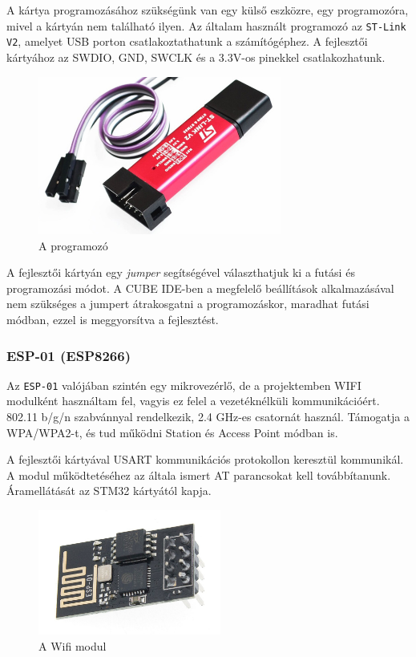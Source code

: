 \documentclass[a4paper, 12pt]{article}
\begin{document}
A kártya programozásához szükségünk van egy külső eszközre, egy programozóra, mivel a kártyán nem található ilyen. Az általam használt programozó az \texttt{ST-Link V2}, amelyet USB porton csatlakoztathatunk a számítógéphez. A fejlesztői kártyához az SWDIO, GND, SWCLK és a 3.3V-os pinekkel csatlakozhatunk.

\begin{figure}[ht]
	\centering
	\includegraphics[width = 8cm]{images/stlink.jpg}
	\caption{A programozó}
	\label{fig:stlink}
\end{figure}	

A fejlesztői kártyán egy \textit{jumper} segítségével választhatjuk ki a futási és programozási módot. A CUBE IDE-ben a megfelelő beállítások alkalmazásával nem szükséges a jumpert átrakosgatni a programozáskor, maradhat futási módban, ezzel is meggyorsítva a fejlesztést.

\subsubsection{ESP-01 (ESP8266)}
Az \texttt{ESP-01} valójában szintén egy mikrovezérlő, de a projektemben WIFI modulként használtam fel, vagyis ez felel a vezetéknélküli kommunikációért. 802.11 b/g/n szabvánnyal rendelkezik, 2.4 GHz-es csatornát használ. Támogatja a WPA/WPA2-t, és tud működni Station és Access Point módban is.

A fejlesztői kártyával USART kommunikációs protokollon keresztül kommunikál. A modul működtetéséhez az általa ismert AT parancsokat kell továbbítanunk. Áramellátását az STM32 kártyától kapja.

\begin{figure}[ht]
	\centering
	\includegraphics[width = 6cm]{images/esp01.jpg}
	\caption{A Wifi modul}
	\label{fig:esp01}
\end{figure}	
\end{document}
